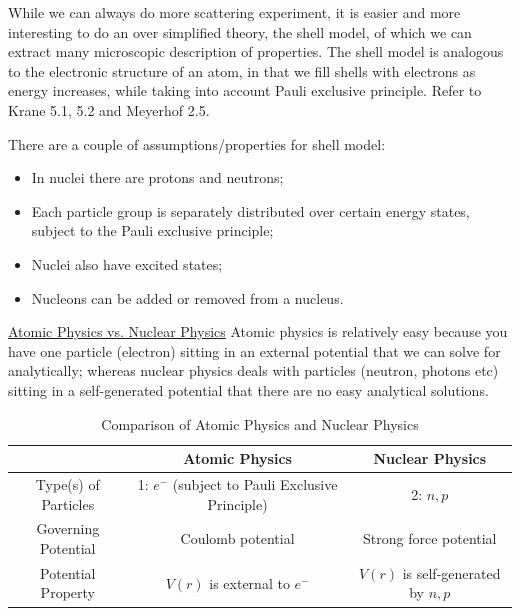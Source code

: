 \documentclass{school-22.101-notes}
\date{November 2, 2011}
\begin{document}
\maketitle



While we can always do more scattering experiment, it is easier and more interesting to do an over simplified theory, the shell model, of which we can extract many microscopic description of properties. The shell model is analogous to the electronic structure of an atom, in that we fill shells with electrons as energy increases, while taking into account Pauli exclusive principle. Refer to Krane 5.1, 5.2 and Meyerhof 2.5. 

There are a couple of assumptions/properties for shell model: 
\begin{itemize}
\item In nuclei there are protons and neutrons;
\item Each particle group is separately distributed over certain energy states, subject to the Pauli exclusive principle;
\item Nuclei also have excited states;
\item Nucleons can be added or removed from a nucleus. 
\end{itemize}

\uline{Atomic Physics vs. Nuclear Physics}
Atomic physics is relatively easy because you have one particle (electron) sitting in an external potential that we can solve for analytically; whereas nuclear physics deals with particles (neutron, photons etc) sitting in a self-generated potential that there are no easy analytical solutions. 
\begin{table}[h!]
    \centering
    \begin{tabular}{|c|c|c|} \hline
    & Atomic Physics & Nuclear Physics \\ \hline
    Type(s) of Particles &   1: $e^-$ (subject to Pauli Exclusive Principle) & 2: $n, p$ \\ \hline
    Governing Potential & Coulomb potential & Strong force potential \\ \hline
    Potential Property & $V(r)$ is external to $e^-$ & $V(r)$ is self-generated by $n,p$ \\ \hline
    \end{tabular}
    \caption{Comparison of Atomic Physics and Nuclear Physics}
\end{table}
\end{document}

